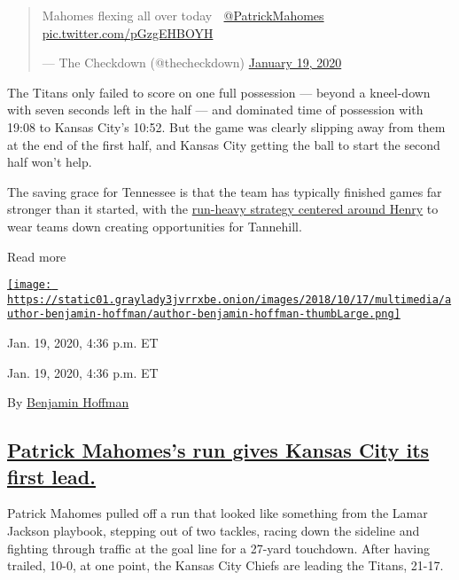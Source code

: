 \begin{quote}
Mahomes flexing all over today 💪
\href{https://twitter.com/PatrickMahomes?ref_src=twsrc\%5Etfw}{@PatrickMahomes}
\href{https://t.co/pGzgEHBOYH}{pic.twitter.com/pGzgEHBOYH}

--- The Checkdown (@thecheckdown)
\href{https://twitter.com/thecheckdown/status/1219009549027307520?ref_src=twsrc\%5Etfw}{January
19, 2020}
\end{quote}

The Titans only failed to score on one full possession --- beyond a
kneel-down with seven seconds left in the half --- and dominated time of
possession with 19:08 to Kansas City's 10:52. But the game was clearly
slipping away from them at the end of the first half, and Kansas City
getting the ball to start the second half won't help.

The saving grace for Tennessee is that the team has typically finished
games far stronger than it started, with the
\href{https://www.nytimes3xbfgragh.onion/2020/01/16/sports/derrick-henry-titans-playoffs.html}{run-heavy
strategy centered around Henry} to wear teams down creating
opportunities for Tannehill.

Read more

\href{https://www.nytimes3xbfgragh.onion/by/benjamin-hoffman}{\texttt{[image: https://static01.graylady3jvrrxbe.onion/images/2018/10/17/multimedia/author-benjamin-hoffman/author-benjamin-hoffman-thumbLarge.png]}}

Jan. 19, 2020, 4:36 p.m. ET

Jan. 19, 2020, 4:36 p.m. ET

By
\href{https://www.nytimes3xbfgragh.onion/by/benjamin-hoffman}{Benjamin
Hoffman}

\hypertarget{patrick-mahomess-run-gives-kansas-city-its-first-lead}{%
\subsection{\texorpdfstring{\protect\hyperlink{patrick-mahomess-run-gives-kansas-city-its-first-lead}{Patrick
Mahomes's run gives Kansas City its first
lead.}}{Patrick Mahomes's run gives Kansas City its first lead.}}\label{patrick-mahomess-run-gives-kansas-city-its-first-lead}}

Patrick Mahomes pulled off a run that looked like something from the
Lamar Jackson playbook, stepping out of two tackles, racing down the
sideline and fighting through traffic at the goal line for a 27-yard
touchdown. After having trailed, 10-0, at one point, the Kansas City
Chiefs are leading the Titans, 21-17.

